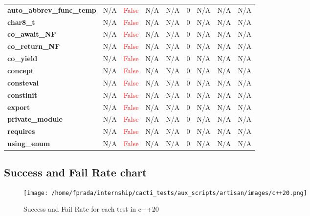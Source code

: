 \documentclass{article}
\begin{document}
\begin{xltabular}{\textwidth}{lcccccccc}
\textbf{{\fontsize{10}{12}\selectfont auto\_abbrev\_func\_temp}}& N/A&\textcolor{red}{False}& N/A&N/A& 0&N/A& N/A&N/A \\[0.5ex]
\textbf{{\fontsize{10}{12}\selectfont char8\_t}}& N/A&\textcolor{red}{False}& N/A&N/A& 0&N/A& N/A&N/A \\[0.5ex]
\textbf{{\fontsize{10}{12}\selectfont co\_await\_NF}}& N/A&\textcolor{red}{False}& N/A&N/A& 0&N/A& N/A&N/A \\[0.5ex]
\textbf{{\fontsize{10}{12}\selectfont co\_return\_NF}}& N/A&\textcolor{red}{False}& N/A&N/A& 0&N/A& N/A&N/A \\[0.5ex]
\textbf{{\fontsize{10}{12}\selectfont co\_yield}}& N/A&\textcolor{red}{False}& N/A&N/A& 0&N/A& N/A&N/A \\[0.5ex]
\textbf{{\fontsize{10}{12}\selectfont concept}}& N/A&\textcolor{red}{False}& N/A&N/A& 0&N/A& N/A&N/A \\[0.5ex]
\textbf{{\fontsize{10}{12}\selectfont consteval}}& N/A&\textcolor{red}{False}& N/A&N/A& 0&N/A& N/A&N/A \\[0.5ex]
\textbf{{\fontsize{10}{12}\selectfont constinit}}& N/A&\textcolor{red}{False}& N/A&N/A& 0&N/A& N/A&N/A \\[0.5ex]
\textbf{{\fontsize{10}{12}\selectfont export}}& N/A&\textcolor{red}{False}& N/A&N/A& 0&N/A& N/A&N/A \\[0.5ex]
\textbf{{\fontsize{10}{12}\selectfont private\_module}}& N/A&\textcolor{red}{False}& N/A&N/A& 0&N/A& N/A&N/A \\[0.5ex]
\textbf{{\fontsize{10}{12}\selectfont requires}}& N/A&\textcolor{red}{False}& N/A&N/A& 0&N/A& N/A&N/A \\[0.5ex]
\textbf{{\fontsize{10}{12}\selectfont using\_enum}}& N/A&\textcolor{red}{False}& N/A&N/A& 0&N/A& N/A&N/A \\[0.5ex]
\bottomrule
\end{xltabular}
\newpage
\subsection{Success and Fail Rate chart}
\begin{figure}[h!]
\centering
\texttt{[image: /home/fprada/internship/cacti\_tests/aux\_scripts/artisan/images/c++20.png]}
\caption{Success and Fail Rate for each test in c++20}
\label{fig:c++20}
\end{figure}
\newpage
\end{document}
